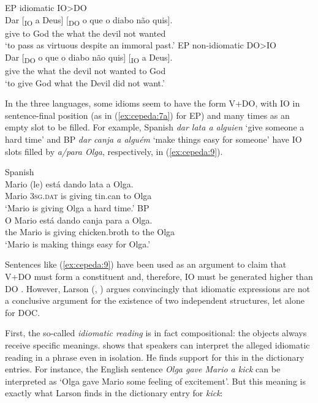 \documentclass[output=paper,colorlinks,citecolor=brown,nonflat]{./langscibook}
\begin{document}
\ea%
    \label{ex:cepeda:8}
	\ea\label{ex:cepeda:8a}
	EP idiomatic IO>DO\\
	\gll Dar [\textsubscript{IO} a  Deus] [\textsubscript{DO} o que o diabo não quis].\\
		give \hspaceThis{[\textsubscript{IO}} to God \hspaceThis{[\textsubscript{DO}} the what the devil  not  wanted\\
	\glt ‘to pass as virtuous despite an immoral past.’
	\ex\label{ex:cepeda:8b}
	EP non-idiomatic DO>IO\\
	\gll Dar [\textsubscript{DO} o que o diabo não quis] [\textsubscript{IO} a  Deus]. \\
		give \hspaceThis{[\textsubscript{DO}} the what the devil  not  wanted \hspaceThis{[\textsubscript{IO}} to God\\
	\glt ‘to give God what the Devil did not want.’
	\z
\z

In the three languages, some idioms seem to have the form V+DO, with IO in sentence-final position (as in (\ref{ex:cepeda:7a}) for EP) and many times as an empty slot to be filled. For example, Spanish \textit{dar lata a alguien} ‘give someone a hard time’ and BP \textit{dar canja a alguém} ‘make things easy for someone’ have IO slots filled by \textit{a/para Olga}, respectively, in (\ref{ex:cepeda:9}).

\ea%
    \label{ex:cepeda:9}
	\ea\label{ex:cepeda:9a}
	Spanish\\
	\gll Mario (le) está dando lata a  Olga.\\
		Mario \textsc{3sg.dat} is giving tin.can to Olga\\
	\glt ‘Mario is giving Olga a hard time.’
	\ex\label{ex:cepeda:9b}
	BP\\
	\gll O Mario está dando canja para a Olga.\\
		the Mario is    giving chicken.broth  to   the Olga\\
	\glt ‘Mario is making things easy for Olga.’
	\z
\z

Sentences like (\ref{ex:cepeda:9}) have been used as an argument to claim that V+DO must form a constituent and, therefore, IO must be generated higher than DO \citep{Bleam2003}. However, Larson (\citeyear{Larson2014}, \citeyear{Larson2017}) argues convincingly that idiomatic expressions are not a conclusive argument for the existence of two independent structures, let alone for DOC.

First, the so-called \textit{idiomatic reading} is in fact compositional: the objects always receive specific meanings. \citet{Larson2017} shows that speakers can interpret the alleged idiomatic reading in a phrase even in isolation. He finds support for this in the dictionary entries. For instance, the English sentence \textit{Olga gave Mario a kick} can be interpreted as ‘Olga gave Mario some feeling of excitement’. But this meaning is exactly what Larson finds in the dictionary entry for \textit{kick}:
\end{document}
